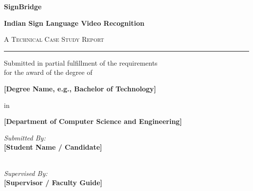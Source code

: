 \documentclass[11pt,a4paper,oneside]{report}
\begin{document}
\begin{titlepage}
    \centering
    \vspace*{0.3cm}
    
    {\LARGE \bfseries SignBridge\par}
    \vspace{0.25cm}
    {\Large \bfseries Indian Sign Language Video Recognition\par}
    \vspace{0.4cm}
    {\large \textsc{A Technical Case Study Report}\par}
    
    \vspace{1.0cm}
    \rule{0.85\textwidth}{1.0pt}
    \vspace{0.6cm}
    
    {\normalsize Submitted in partial fulfillment of the requirements\\
    for the award of the degree of\par}
    \vspace{0.25cm}
    {\large \bfseries [Degree Name, e.g., Bachelor of Technology]\par}
    \vspace{0.15cm}
    {\normalsize in\par}
    \vspace{0.15cm}
    {\normalsize \bfseries [Department of Computer Science and Engineering]\par}
    
    \vspace{1.2cm}
    \begin{minipage}{0.48\textwidth}
        \begin{flushleft} \normalsize
            \emph{Submitted By:}\\
            \textbf{[Student Name / Candidate]}\\[0.1cm]
            \\[0.1cm]
        \end{flushleft}
    \end{minipage}
    \hfill
    \begin{minipage}{0.48\textwidth}
        \begin{flushright} \normalsize
            \emph{Supervised By:}\\
            \textbf{[Supervisor / Faculty Guide]}\\[0.1cm]
            \\[0.1cm]
        \end{flushright}
    \end{minipage}
    

\end{titlepage}
\end{document}
